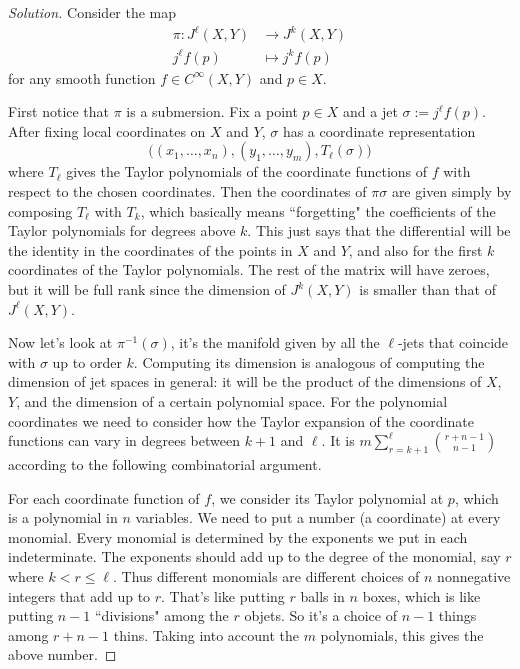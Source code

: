 \begin{proof}[Solution]\leavevmode
Consider the map
\begin{align*}
	\pi: J^\ell(X,Y) &\longrightarrow J^{k}(X,Y) \\
	j^\ell f(p) &\longmapsto j^k f(p)
\end{align*}
for any smooth function \(f \in C^\infty(X,Y)\) and \(p \in X\).

First notice that \(\pi\) is a submersion. Fix a point \(p \in X\) and a jet \(\sigma:= j^\ell f(p)\). After fixing local coordinates on \(X\) and \(Y\), \(\sigma\) has a coordinate representation \[\Big((x_1,\ldots,x_n), (y_1,\ldots,y_m),T_\ell(\sigma)\Big)\] where \(T_\ell\) gives the Taylor polynomials of the coordinate functions of \(f\) with respect to the chosen coordinates. Then the coordinates of \(\pi\sigma\) are given simply by composing \(T_\ell\) with \(T_k\), which basically means ``forgetting" the coefficients of the Taylor polynomials for degrees above \(k\). This just says that the differential will be the identity in the coordinates of the points in \(X\) and \(Y\), and also for the first \(k\) coordinates of the Taylor polynomials. The rest of the matrix will have zeroes, but it will be full rank since the dimension of \(J^k(X,Y)\) is smaller than that of  \(J^\ell(X,Y)\).

Now let's look at \(\pi^{-1}(\sigma)\), it's the manifold given by all the \(\ell\)-jets that coincide with \(\sigma\) up to order \(k\). Computing its dimension is analogous of computing the dimension of jet spaces in general: it will be the product of the dimensions of \(X\), \(Y\), and the dimension of a certain polynomial space. For the polynomial coordinates we need to consider how the Taylor expansion of the coordinate functions can vary in degrees between  \(k+1\) and \(\ell\). It is \(m \sum_{r=k+1}^\ell \binom{r+n-1}{n-1}\) according to the following combinatorial argument.

For each coordinate function of \(f\), we consider its Taylor polynomial at \(p\), which is a polynomial in  \(n\) variables. We need to put a number (a coordinate) at every monomial. Every monomial is determined by the exponents we put in each indeterminate. The exponents should add up to the degree of the monomial, say \(r\) where \(k<r\leq \ell\). Thus different monomials are different choices of \(n\) nonnegative integers that add up to \(r\). That's like putting \(r\) balls in \(n\) boxes, which is like putting \(n-1\) ``divisions" among the \(r\) objets. So it's a choice of \(n-1\) things among \(r+n-1\) thins. Taking into account the \(m\) polynomials, this gives the above number.


\end{proof}
